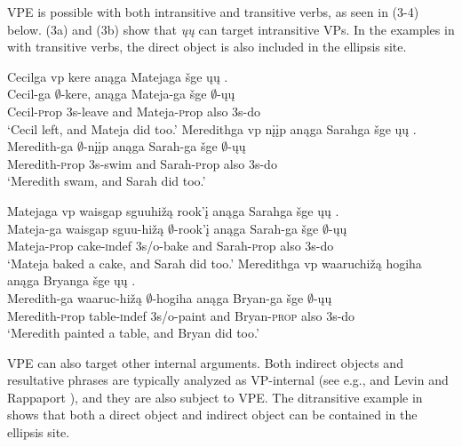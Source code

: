 \documentclass[output=paper]{LSP/langsci}
\begin{document}
VPE is possible with both intransitive and transitive verbs, as seen in (3-4) below. (3a) and (3b) show that \emph{ųų} can target intransitive VPs. In the examples in  with transitive verbs, the direct object is also included in the ellipsis site.

\begin{exe}
\ex
\begin{xlist}
\ex
\glll Cecilga {\ob}{vp} kere{\cb} anąga Matejaga šge {\ob}ųų{\cb} .\\
Cecil-ga {} $\emptyset$-kere, anąga Mateja-ga šge $\emptyset$-ųų\\
Cecil-{\textsc prop} {} {\textsc 3s}-leave and Mateja-{\textsc prop} also {\textsc 3s}-do\\
\trans `Cecil left, and Mateja did too.'
\ex
\glll Meredithga {\ob}{vp} nįįp{\cb} anąga Sarahga šge {\ob}ųų{\cb} .\\
Meredith-ga {} $\emptyset$-nįįp anąga Sarah-ga šge $\emptyset$-ųų\\
Meredith-{\textsc prop} {} {\textsc 3s}-swim and Sarah-{\textsc prop} also {\textsc 3s}-do\\
\trans `Meredith swam, and Sarah did too.'
\end{xlist}
\end{exe}

\begin{exe}
\ex
\begin{xlist}
\ex
\glll Matejaga {\ob}{vp} {waisgap sguuhižą} rook'į{\cb} anąga Sarahga šge {\ob}ųų{\cb} .\\
Mateja-ga {} {waisgap sguu-hižą} $\emptyset$-rook'į anąga Sarah-ga šge $\emptyset$-ųų\\
Mateja-{\textsc prop} {} cake-{\textsc indef} {\textsc 3s/o}-bake and Sarah-{\textsc prop} also {\textsc 3s}-do\\
\trans `Mateja baked a cake, and Sarah did too.'
\ex
\glll Meredithga {\ob}{vp} waaruchižą hogiha{\cb} anąga Bryanga šge {\ob}ųų{\cb} .\\
Meredith-ga {} waaruc-hižą $\emptyset$-hogiha anąga Bryan-ga šge $\emptyset$-ųų\\
Meredith-{\textsc prop} {} table-{\textsc indef} {\textsc 3s/o}-paint and Bryan-\textsc{prop} also {\textsc 3s}-do\\
\trans `Meredith painted a table, and Bryan did too.'
\end{xlist}
\end{exe}

VPE can also target other internal arguments. Both indirect objects and resultative phrases are typically analyzed as VP-internal (see e.g., \citealt{Larson1988} and Levin and Rappaport \citealt{Hovav1995}), and they are also subject to VPE. The ditransitive example in  shows that both a direct object and indirect object can be contained in the ellipsis site.
\end{document}

